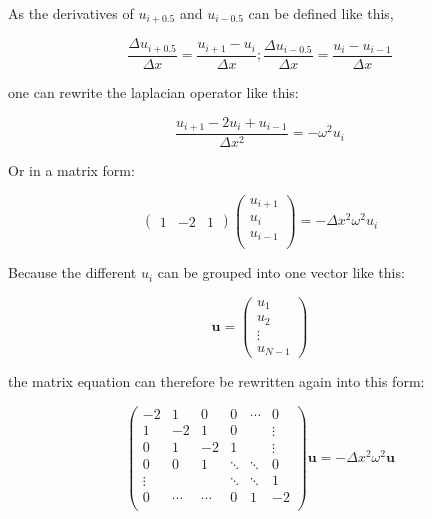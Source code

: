 As the derivatives of $u_{i+0.5}$ and $u_{i-0.5}$ can be defined like this,

\begin{equation}
\frac{\Delta u_{i+0.5}}{\Delta x} = \frac{u_{i+1}-u_i}{\Delta x}; \frac{\Delta u_{i-0.5}}{\Delta x} = \frac{u_i-u_{i-1}}{\Delta x}
\end{equation}

one can rewrite the laplacian operator like this:

\begin{equation}
    \frac{u_{i+1}-2u_{i}+u_{i-1}}{\Delta x^2} = -\omega^2 u_i \label{eq:dlaplacian}
\end{equation}

Or in a matrix form:

\begin{equation}
    \begin{pmatrix}
        1&-2&1
    \end{pmatrix}
    \begin{pmatrix}
        u_{i+1}\\
        u_i\\
        u_{i-1}\\
    \end{pmatrix}
    = -\Delta x^2 \omega^2 u_i
\end{equation}

Because the different $u_i$ can be grouped into one vector like this:

\begin{equation}
    \mathbf{u} = 
\begin{pmatrix}
    u_1\\
    u_2\\
    \vdots\\
    u_{N-1}
\end{pmatrix}
\end{equation}

the matrix equation can therefore be rewritten again into this form:

\begin{equation}
\begin{pmatrix}
    -2    &     1&     0&     0&\cdots&      0\\
    1     &    -2&     1&     0&      & \vdots\\
    0     &     1&    -2&     1&      & \vdots\\
    0     &     0&     1&\ddots&\ddots&      0\\
    \vdots&      &      &\ddots&\ddots&      1\\
    0     &\cdots&\cdots&     0&     1&     -2\\
\end{pmatrix}
\mathbf{u} = -\Delta x^2 \omega^2 \mathbf{u}
\end{equation}

